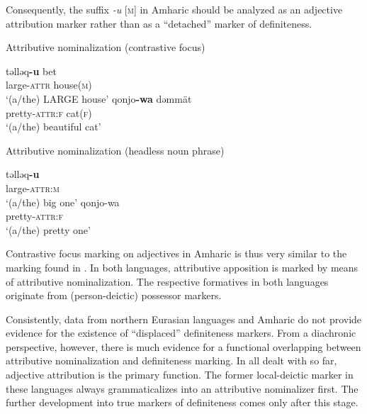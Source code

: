 {Consequently, the suffix \textit{-u} [\textsc{m}] in Amharic should be analyzed as an adjective attribution marker rather than as a “detached” marker of definiteness. 
\begin{exe}
\ex	{}
\begin{xlist}
\ex	\rm{Attributive nominalization (contrastive focus)}
\begin{xlist}
\ex
\gll	təlləq\textbf{-u} bet\\
	large-\textsc{attr} house(\textsc{m})\\
\glt	‘(a/the) LARGE house’
\ex	
\gll	qonjo\textbf{-wa} dəmmät\\
	pretty-\textsc{attr:f} cat(\textsc{f})\\
\glt	‘(a/the) beautiful cat’
\end{xlist}
\ex	\rm{Attributive nominalization (headless noun phrase)}
\begin{xlist}
\ex
\gll	təlləq\textbf{-u}\\
	large-\textsc{attr:m}\\
\glt	‘(a/the) big one’
\ex	
\gll	qonjo-wa\\
	pretty-\textsc{attr:f}\\
\glt	‘(a/the) pretty one’
\end{xlist}
\end{xlist}
\end{exe}
Contrastive focus marking on adjectives in Amharic is thus very similar to the marking found in . In both languages, attributive apposition is marked by means of attributive nominalization. The respective formatives in both languages originate from (person-deictic) possessor markers.

Consistently, data from northern Eurasian languages and Amharic do not provide evidence for the existence of “displaced” definiteness markers. From a diachronic perspective, however, there is much evidence for a functional overlapping between attributive nominalization and definiteness marking. In all  dealt with so far, adjective attribution is the primary function. The former local-deictic marker in these languages always grammaticalizes into an attributive nominalizer first. The further development into true markers of definiteness comes only after this stage.

}
